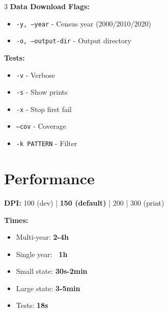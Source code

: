 \documentclass[10pt,landscape]{article}
\begin{document}
\begin{multicols}{3}
\textbf{Data Download Flags:}
\begin{itemize}\itemsep0pt
\item \texttt{-y, --year} - Census year (2000/2010/2020)
\item \texttt{-o, --output-dir} - Output directory
\end{itemize}

\textbf{Tests:}
\begin{itemize}\itemsep0pt
\item \texttt{-v} - Verbose
\item \texttt{-s} - Show prints
\item \texttt{-x} - Stop first fail
\item \texttt{--cov} - Coverage
\item \texttt{-k PATTERN} - Filter
\end{itemize}

\section*{Performance}

\textbf{DPI:} 100 (dev) | \textbf{150 (default)} | 200 | 300 (print)

\textbf{Times:}
\begin{itemize}\itemsep0pt
\item Multi-year: \textbf{2-4h}
\item Single year: \textbf{~1h}
\item Small state: \textbf{30s-2min}
\item Large state: \textbf{3-5min}
\item Tests: \textbf{18s}
\end{itemize}

\end{multicols}
\end{document}
